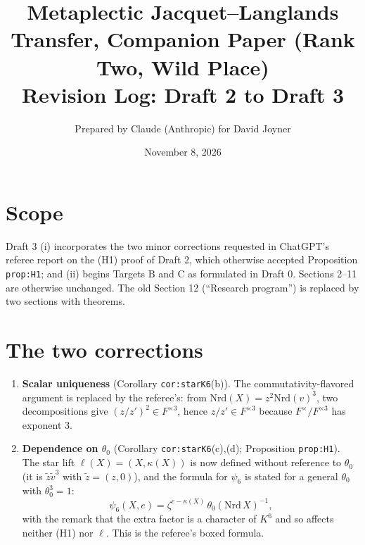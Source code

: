 \documentclass[11pt]{article}
\title{Metaplectic Jacquet--Langlands Transfer, Companion Paper (Rank Two, Wild Place)\\Revision Log: Draft 2 to Draft 3}
\author{Prepared by Claude (Anthropic) for David Joyner}
\date{November 8, 2026}
\begin{document}
\maketitle

\section*{Scope}
Draft 3 (i) incorporates the two minor corrections requested in
ChatGPT's referee report on the (H1) proof of Draft 2, which otherwise
accepted Proposition \texttt{prop:H1}; and (ii) begins Targets B and C as
formulated in Draft 0.  Sections 2--11 are otherwise unchanged.  The old
Section 12 (``Research program'') is replaced by two sections with
theorems.

\section*{The two corrections}
\begin{enumerate}[leftmargin=*]
\item \textbf{Scalar uniqueness} (Corollary \texttt{cor:starK6}(b)).
The commutativity-flavored argument is replaced by the referee's: from
$\mathrm{Nrd}(X)=z^2\mathrm{Nrd}(v)^3$, two decompositions give
$(z/z')^2\in F^{\times3}$, hence $z/z'\in F^{\times3}$ because
$F^\times/F^{\times3}$ has exponent $3$.
\item \textbf{Dependence on $\theta_0$} (Corollary \texttt{cor:starK6}(c),(d);
Proposition \texttt{prop:H1}).  The star lift $\ell(X)=(X,\kappa(X))$ is
now defined without reference to $\theta_0$ (it is $\tilde z\tilde v^3$
with $\tilde z=(z,0)$), and the formula for $\psi_6$ is stated for a
general $\theta_0$ with $\theta_0^3=1$:
\[
 \psi_6(X,e)=\zeta^{e-\kappa(X)}\,\theta_0(\mathrm{Nrd}\,X)^{-1},
\]
with the remark that the extra factor is a character of $K^6$ and so
affects neither (H1) nor $\ell$.  This is the referee's boxed formula.
\end{enumerate}
\end{document}
